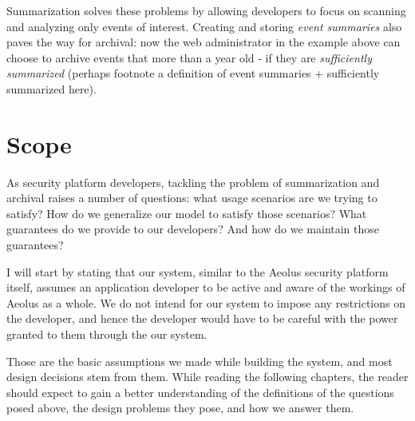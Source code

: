 Summarization solves these problems by allowing developers to focus on scanning and analyzing only events of interest. Creating and storing \emph{event summaries} also paves the way for archival: now the web administrator in the example above can choose to archive events that more than a year old - if they are \emph{sufficiently summarized} (perhaps footnote a definition of event summaries + sufficiently summarized here).

\section{Scope}

As security platform developers, tackling the problem of summarization and archival raises a number of questions: what usage scenarios are we trying to satisfy? How do we generalize our model to satisfy those scenarios? What guarantees do we provide to our developers? And how do we maintain those guarantees?

I will start by stating that our system, similar to the Aeolus security platform itself, assumes an application developer to be active and aware of the workings of Aeolus as a whole. We do not intend for our system to impose any restrictions on the developer, and hence the developer would have to be careful with the power granted to them through the our system.

Those are the basic assumptions we made while building the system, and most design decisions stem from them. While reading the following chapters, the reader should expect to gain a better understanding of the definitions of the questions posed above, the design problems they pose, and how we answer them.
